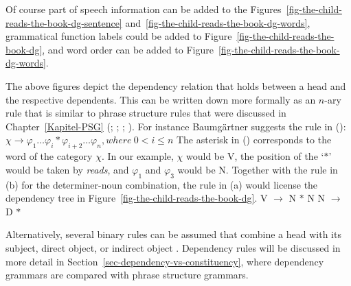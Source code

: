 Of course part of speech information can be added to the Figures~\ref{fig-the-child-reads-the-book-dg-sentence}
and~\ref{fig-the-child-reads-the-book-dg-words}, grammatical function labels could be added to
Figure~\ref{fig-the-child-reads-the-book-dg}, and word order can be added to Figure~\ref{fig-the-child-reads-the-book-dg-words}.


The above figures depict the dependency relation that holds between a head and the respective
dependents. This can be written down more formally as an $n$-ary rule\label{page-rule-format-dg} that is similar to phrase
structure rules that were discussed in Chapter~\ref{Kapitel-PSG} (\citealp[]{Gaifman65a}; \citealp[]{Hays64a-u}; \citealp[]{Baumgaertner70a}; \citealp[Section~4.1]{Heringer96a-u}). For instance Baumgärtner suggests the
rule in ():
\ea
$\chi \to \varphi_1 \ldots \varphi_i * \varphi_{i+2} \ldots \varphi_n, where~0 < i \leq n$
\z
The asterisk in () corresponds to the word of the category $\chi$. In our example, $\chi$
would be V, the position of the `$*$' would be taken by \emph{reads}, and $\varphi_1$ and
$\varphi_3$ would be N. Together with the rule in (b) for the determiner-noun combination, the rule in (a) would license
the dependency tree in Figure~\ref{fig-the-child-reads-the-book-dg}.%
\eal
\ex V $\to$ N $*$ N
\ex N $\to$ D $*$
\zl\pagebreak

\noindent
Alternatively, several binary rules can be assumed that combine a head with
its subject, direct object, or indirect object \citep{Kahane2009a}. Dependency rules will be discussed in
more detail in Section~\ref{sec-dependency-vs-constituency}, where dependency grammars are compared with phrase structure grammars.






